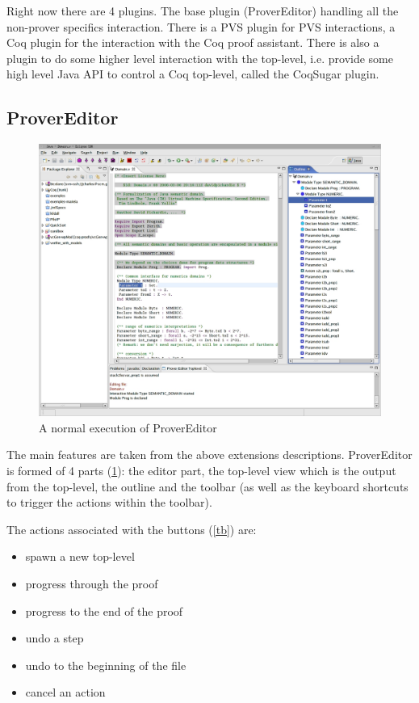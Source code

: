 \documentclass{entcs}
\begin{document}
Right now there are 4 plugins. The base plugin (ProverEditor)
handling all the non-prover specifics interaction. There is a PVS plugin for
PVS interactions, a Coq plugin for the interaction with the Coq proof 
assistant. There is also a plugin to do some higher level interaction 
with the top-level, i.e. provide some high level Java API to control 
a Coq top-level, called the CoqSugar plugin. 

\subsection{ProverEditor}
\label{subsec:provereditor}
\begin{figure}
\begin{center}
\includegraphics[width=\linewidth]{screenshot1}
\end{center}
  \caption{A normal execution of ProverEditor}
  \label{scrs1}
\end{figure}
The main features are taken from the above extensions descriptions.
ProverEditor is formed of 4 parts 
(\ref{scrs1}): the editor part, the top-level view which is the output 
from the top-level, the outline and the toolbar (as well as the keyboard 
shortcuts to trigger the actions within the toolbar).

The actions associated with the buttons (\ref{tb}) are:
\begin{itemize}
\item spawn a new top-level
\item progress through the proof
\item progress to the end of the proof
\item undo a step
\item undo to the beginning of the file
\item cancel an action
\end{itemize}
\end{document}
